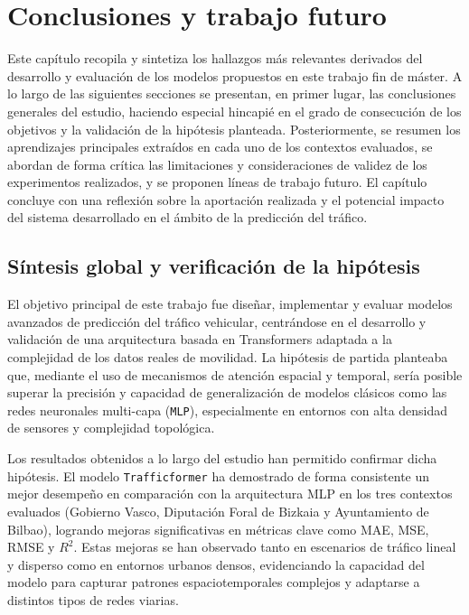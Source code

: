 \section{Conclusiones y trabajo futuro}
\label{sec:conclusiones}

%
%

Este capítulo recopila y sintetiza los hallazgos más relevantes derivados del desarrollo y evaluación de los modelos propuestos en este trabajo fin de máster. A lo largo de las siguientes secciones se presentan, en primer lugar, las conclusiones generales del estudio, haciendo especial hincapié en el grado de consecución de los objetivos y la validación de la hipótesis planteada. Posteriormente, se resumen los aprendizajes principales extraídos en cada uno de los contextos evaluados, se abordan de forma crítica las limitaciones y consideraciones de validez de los experimentos realizados, y se proponen líneas de trabajo futuro. El capítulo concluye con una reflexión sobre la aportación realizada y el potencial impacto del sistema desarrollado en el ámbito de la predicción del tráfico.

\subsection{Síntesis global y verificación de la hipótesis}
\label{sec:sintesis_verif}

El objetivo principal de este trabajo fue diseñar, implementar y evaluar modelos avanzados de predicción del tráfico vehicular, centrándose en el desarrollo y validación de una arquitectura basada en Transformers adaptada a la complejidad de los datos reales de movilidad. La hipótesis de partida planteaba que, mediante el uso de mecanismos de atención espacial y temporal, sería posible superar la precisión y capacidad de generalización de modelos clásicos como las redes neuronales multi-capa (\texttt{MLP}), especialmente en entornos con alta densidad de sensores y complejidad topológica.

Los resultados obtenidos a lo largo del estudio han permitido confirmar dicha hipótesis. El modelo \texttt{Trafficformer} ha demostrado de forma consistente un mejor desempeño en comparación con la arquitectura MLP en los tres contextos evaluados (Gobierno Vasco, Diputación Foral de Bizkaia y Ayuntamiento de Bilbao), logrando mejoras significativas en métricas clave como MAE, MSE, RMSE y $R^2$. Estas mejoras se han observado tanto en escenarios de tráfico lineal y disperso como en entornos urbanos densos, evidenciando la capacidad del modelo para capturar patrones espaciotemporales complejos y adaptarse a distintos tipos de redes viarias.

